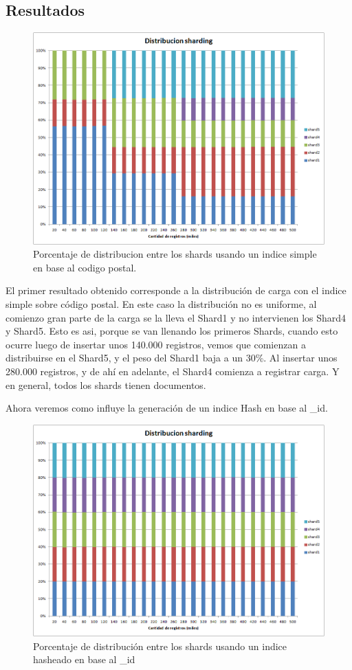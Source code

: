 \subsection{Resultados}
\begin{figure}[H]
\centering
\includegraphics[width=165mm]{../mediciones/sharding_simple.png}
\caption{Porcentaje de distribucion entre los shards usando un
indice simple en base al codigo postal.}
\end{figure}

El primer resultado obtenido corresponde a la distribución de carga con el indice simple sobre código postal. En este caso la distribución no es uniforme, al comienzo gran parte de la carga se la lleva el Shard1 y no intervienen los Shard4 y Shard5. Esto es asi, porque se van llenando los primeros Shards, cuando esto ocurre luego de insertar unos 140.000 registros, vemos que comienzan a distribuirse en el Shard5, y el peso del Shard1 baja a un 30\%.
Al insertar unos 280.000 registros, y de ahí en adelante, el Shard4 comienza a registrar carga. Y en general, todos los shards tienen documentos. 

Ahora veremos como influye la generación de un indice Hash en base al \_id.
\begin{figure}[H]
\centering
\includegraphics[width=165mm]{../mediciones/sharding_hashed.png}
\caption{Porcentaje de distribución entre los shards usando un
indice hasheado en base al \_id}
\end{figure}

